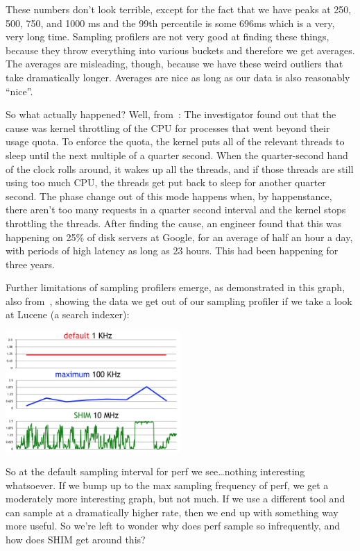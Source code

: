 \documentclass[a4paper]{report}
\begin{document}
These numbers don't look terrible, except for the fact that we have peaks at 250, 500, 750, and 1000 ms and the 99th percentile is some 696ms which is a very, very long time. Sampling profilers are not very good at finding these things, because they throw everything into various buckets and therefore we get averages. The averages are misleading, though, because we have these weird outliers that take dramatically longer. Averages are nice as long as our data is also reasonably ``nice''.

So what actually happened? Well, from~\cite{perf-tracing}: The investigator found out that the cause was kernel throttling of the CPU for processes that went beyond their usage quota. To enforce the quota, the kernel puts all of the relevant threads to sleep until the next multiple of a quarter second. When the quarter-second hand of the clock rolls around, it wakes up all the threads, and if those threads are still using too much CPU, the threads get put back to sleep for another quarter second. The phase change out of this mode happens when, by happenstance, there aren't too many requests in a quarter second interval and the kernel stops throttling the threads. After finding the cause, an engineer found that this was happening on 25\% of disk servers at Google, for an average of half an hour a day, with periods of high latency as long as 23 hours. This had been happening for three years.

Further limitations of sampling profilers emerge, as demonstrated in this graph, also from~\cite{perf-tracing}, showing the data we get out of our sampling profiler if we take a look at Lucene (a search indexer):

\begin{center}
	\includegraphics[width=0.5\textwidth]{images/perf-sample.png}
\end{center}

So at the default sampling interval for perf we see\ldots nothing interesting whatsoever. If we bump up to the max sampling frequency of perf, we get a moderately more interesting graph, but not much. If we use a different tool and can sample at a dramatically higher rate, then we end up with something way more useful. So we're left to wonder why does perf sample so infrequently, and how does SHIM get around this?
\end{document}
